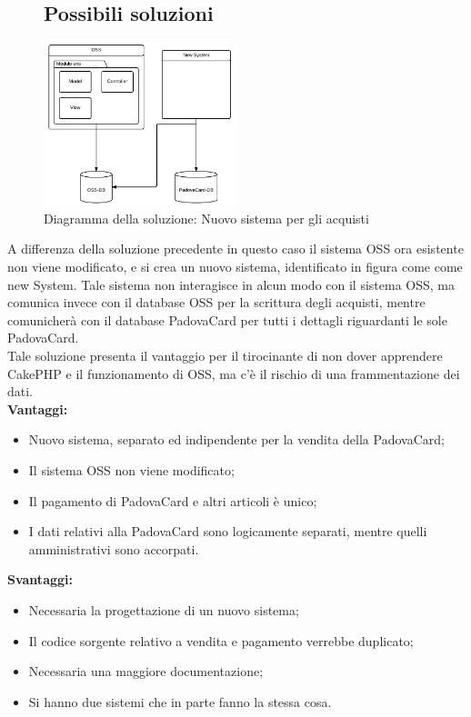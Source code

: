 \begin{figure}[H]\subsection{Possibili soluzioni}
\centering
\includegraphics[width=0.5\textwidth]{images/Nuovo_sistema_per_gli_acquisti.png}
\caption{Diagramma della soluzione: Nuovo sistema per gli acquisti}
\end{figure}
A differenza della soluzione precedente in questo caso il sistema OSS ora esistente non viene modificato, e si crea un nuovo sistema, identificato in figura come come new System. Tale sistema non interagisce in alcun modo con il sistema OSS, ma comunica invece con il database OSS per la scrittura degli acquisti, mentre comunicherà con il database PadovaCard per tutti i dettagli riguardanti le sole PadovaCard.\\

Tale soluzione presenta il vantaggio per il tirocinante di non dover apprendere CakePHP e il funzionamento di OSS, ma c'è il rischio di una frammentazione dei dati. \\
\textbf{Vantaggi:}
\begin{itemize}
\item Nuovo sistema, separato ed indipendente per la vendita della PadovaCard;
\item Il sistema OSS non viene modificato;
\item Il pagamento di PadovaCard e altri articoli è unico;
\item I dati relativi alla PadovaCard sono logicamente separati, mentre quelli amministrativi sono accorpati.
\end{itemize}
\textbf{Svantaggi:}
\begin{itemize}
\item Necessaria la progettazione di un nuovo sistema;
\item Il codice sorgente relativo a vendita e pagamento verrebbe duplicato;
\item Necessaria una maggiore documentazione;
\item Si hanno due sistemi che in parte fanno la stessa cosa.
\end{itemize}


